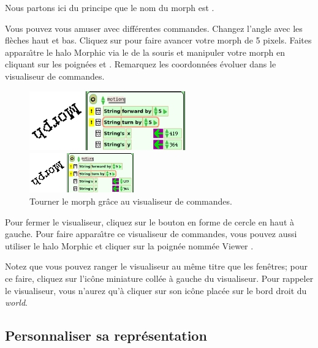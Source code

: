 \documentclass[a4paper,10pt,twoside]{book}
\begin{document}
Nous partons ici du principe que le nom du morph est .


Vous pouvez vous amuser avec diff\'erentes commandes. Changez l'angle
avec les fl\`eches haut et bas. Cliquez sur 
pour faire avancer votre morph de 5 pixels. Faites appara\^{\i}tre le halo
Morphic via le  de la souris et manipuler votre
morph en cliquant sur les poign\'ees \grabHandle{} et \rotateHandle{}.
Remarquez les coordonn\'ees \'evoluer dans le visualiseur de commandes.

\begin{figure}[ht]
	\ifluluelse
		{\centerline{\includegraphics[width=0.6\textwidth]{turningInViewer}}}
		{\centerline{\includegraphics[width=0.4\textwidth]{turningInViewer}}}
	\caption{Tourner le morph gr\^ace au visualiseur de commandes.\label{fig:turningInViewer}}
\end{figure}

Pour fermer le visualiseur, cliquez sur le bouton en forme de cercle
en haut \`a gauche. Pour faire appara\^{\i}tre ce visualiseur de
commandes, vous pouvez aussi utiliser le halo Morphic et cliquer sur
la poign\'ee nomm\'ee Viewer \viewerHandle{}.
   
Notez que vous pouvez ranger le visualiseur au m\^eme titre que les
fen\^etres; pour ce faire, cliquez sur l'ic\^one miniature coll\'ee \`a
gauche du visualiseur. Pour rappeler le visualiseur, vous n'aurez
qu'\`a cliquer sur son ic\^one plac\'ee sur le bord droit du \emph{world}.

\subsection{Personnaliser sa repr\'esentation}
\end{document}
